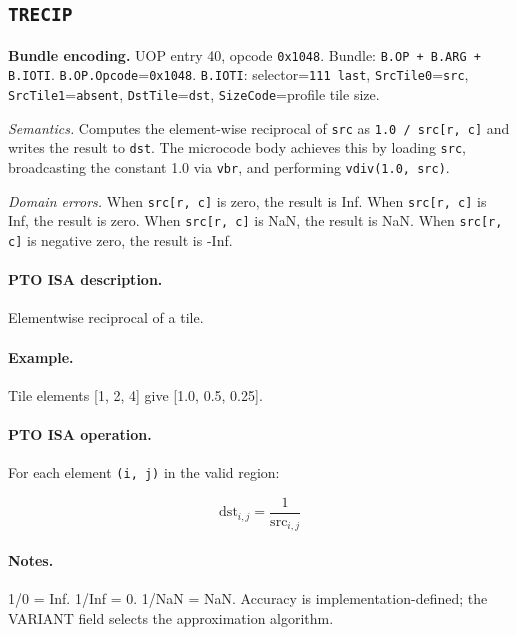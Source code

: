 \subsection{\texttt{TRECIP}}
\noindent\textbf{Bundle encoding.} UOP entry 40, opcode \texttt{0x1048}. Bundle: \texttt{B.OP + B.ARG + B.IOTI}. \texttt{B.OP.Opcode}=\texttt{0x1048}. \texttt{B.IOTI}: selector=\texttt{111 last}, \texttt{SrcTile0}=\texttt{src}, \texttt{SrcTile1}=\texttt{absent}, \texttt{DstTile}=\texttt{dst}, \texttt{SizeCode}=profile tile size.\par\smallskip

\textit{Semantics.} Computes the element-wise reciprocal of \texttt{src} as \texttt{1.0 / src[r, c]} and writes the result to \texttt{dst}. The microcode body achieves this by loading \texttt{src}, broadcasting the constant 1.0 via \texttt{vbr}, and performing \texttt{vdiv(1.0, src)}.

\textit{Domain errors.} When \texttt{src[r, c]} is zero, the result is Inf. When \texttt{src[r, c]} is Inf, the result is zero. When \texttt{src[r, c]} is NaN, the result is NaN. When \texttt{src[r, c]} is negative zero, the result is -Inf.\par\smallskip
{\small
\paragraph{PTO ISA description.}
Elementwise reciprocal of a tile.
\paragraph{Example.}
Tile elements [1, 2, 4] give [1.0, 0.5, 0.25].
\par\smallskip
\paragraph{PTO ISA operation.}
For each element \texttt{(i, j)} in the valid region:

\[
\mathrm{dst}_{i,j} = \frac{1}{\mathrm{src}_{i,j}}
\]
}\par\smallskip
\paragraph{Notes.}
1/0 = Inf. 1/Inf = 0. 1/NaN = NaN. Accuracy is implementation-defined; the VARIANT field selects the approximation algorithm.
